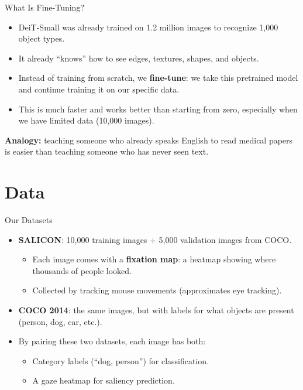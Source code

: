 \documentclass{beamer}
\begin{document}
\begin{frame}{What Is Fine-Tuning?}
\begin{itemize}
  \item DeiT-Small was already trained on 1.2 million images to recognize 1,000 object types.
  \item It already ``knows'' how to see edges, textures, shapes, and objects.
  \item Instead of training from scratch, we \textbf{fine-tune}: we take this pretrained model and continue training it on our specific data.
  \item This is much faster and works better than starting from zero, especially when we have limited data (10,000 images).
\end{itemize}
\vfill
\textbf{Analogy:} teaching someone who already speaks English to read medical papers is easier than teaching someone who has never seen text.
\end{frame}

\section{Data}

\begin{frame}{Our Datasets}
\begin{itemize}
  \item \textbf{SALICON}: 10,000 training images + 5,000 validation images from COCO.
  \begin{itemize}
    \item Each image comes with a \textbf{fixation map}: a heatmap showing where thousands of people looked.
    \item Collected by tracking mouse movements (approximates eye tracking).
  \end{itemize}
  \item \textbf{COCO 2014}: the same images, but with labels for what objects are present (person, dog, car, etc.).
  \item By pairing these two datasets, each image has both:
  \begin{itemize}
    \item Category labels (``dog, person'') for classification.
    \item A gaze heatmap for saliency prediction.
  \end{itemize}
\end{itemize}
\end{frame}
\end{document}
